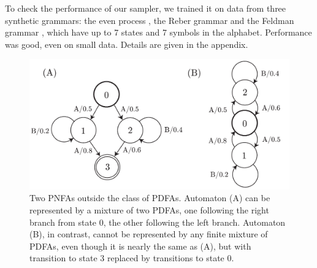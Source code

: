 To check the performance of our sampler, we trained it on data from three synthetic grammars: the even process \cite{?}, the Reber grammar \cite{Reber} and the Feldman grammar \cite{Feldman}, which have up to 7 states and 7 symbols in the alphabet.  Performance was good, even on small data.  Details are given in the appendix.

\begin{figure}
\begin{center}
\includegraphics[scale=0.6]{pnfa.pdf}
\caption{Two PNFAs outside the class of PDFAs.  Automaton (A) can be represented by a mixture of two PDFAs, one following the right branch from state 0, the other following the left branch.  Automaton (B), in contrast, cannot be represented by any finite mixture of PDFAs, even though it is nearly the same as (A), but with transition to state 3 replaced by transitions to state 0.}
\label{pnfa}
\end{center}
\end{figure}